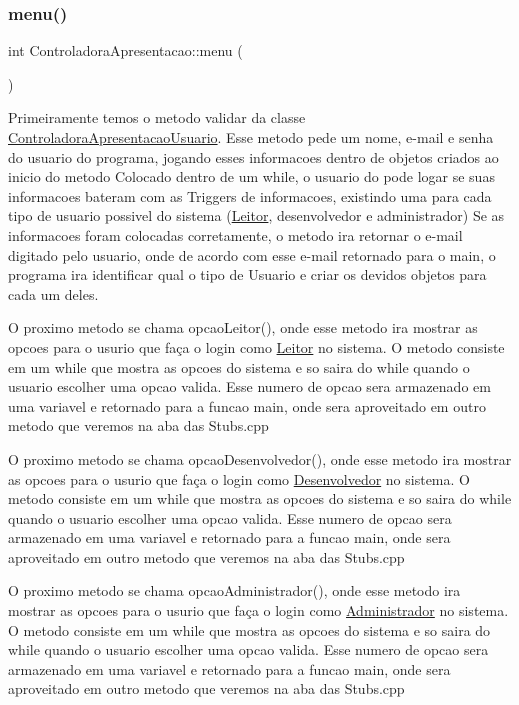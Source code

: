 \subsubsection{\texorpdfstring{menu()}{menu()}}
{\footnotesize\ttfamily int Controladora\+Apresentacao\+::menu (\begin{DoxyParamCaption}{ }\end{DoxyParamCaption})\hspace{0.3cm}{\ttfamily [virtual]}}

Primeiramente temos o metodo validar da classe \mbox{\hyperlink{class_controladora_apresentacao_usuario}{Controladora\+Apresentacao\+Usuario}}. Esse metodo pede um nome, e-\/mail e senha do usuario do programa, jogando esses informacoes dentro de objetos criados ao inicio do metodo Colocado dentro de um while, o usuario do pode logar se suas informacoes bateram com as Triggers de informacoes, existindo uma para cada tipo de usuario possivel do sistema (\mbox{\hyperlink{class_leitor}{Leitor}}, desenvolvedor e administrador) Se as informacoes foram colocadas corretamente, o metodo ira retornar o e-\/mail digitado pelo usuario, onde de acordo com esse e-\/mail retornado para o main, o programa ira identificar qual o tipo de Usuario e criar os devidos objetos para cada um deles.

O proximo metodo se chama opcao\+Leitor(), onde esse metodo ira mostrar as opcoes para o usurio que faça o login como \mbox{\hyperlink{class_leitor}{Leitor}} no sistema. O metodo consiste em um while que mostra as opcoes do sistema e so saira do while quando o usuario escolher uma opcao valida. Esse numero de opcao sera armazenado em uma variavel e retornado para a funcao main, onde sera aproveitado em outro metodo que veremos na aba das Stubs.\+cpp

O proximo metodo se chama opcao\+Desenvolvedor(), onde esse metodo ira mostrar as opcoes para o usurio que faça o login como \mbox{\hyperlink{class_desenvolvedor}{Desenvolvedor}} no sistema. O metodo consiste em um while que mostra as opcoes do sistema e so saira do while quando o usuario escolher uma opcao valida. Esse numero de opcao sera armazenado em uma variavel e retornado para a funcao main, onde sera aproveitado em outro metodo que veremos na aba das Stubs.\+cpp

O proximo metodo se chama opcao\+Administrador(), onde esse metodo ira mostrar as opcoes para o usurio que faça o login como \mbox{\hyperlink{class_administrador}{Administrador}} no sistema. O metodo consiste em um while que mostra as opcoes do sistema e so saira do while quando o usuario escolher uma opcao valida. Esse numero de opcao sera armazenado em uma variavel e retornado para a funcao main, onde sera aproveitado em outro metodo que veremos na aba das Stubs.\+cpp 

